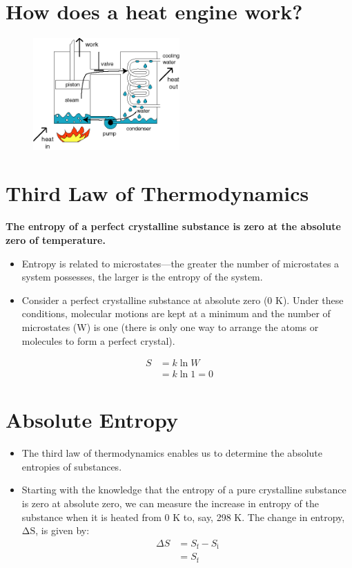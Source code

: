 \documentclass[a4paper,12pt,twocolumn]{article}
\begin{document}
\section{How does a heat engine work?}
\begin{figure}[h]
\centering
\includegraphics[width=0.5\textwidth]{heatengine.png}
\end{figure}

\section{Third Law of Thermodynamics} 
\begin{Box1}{}
\textbf{The entropy of a perfect crystalline substance is zero at the absolute zero of temperature.}
\end{Box1}

\begin{itemize}
\item Entropy is related to microstates—the greater the number of microstates a system possesses, the larger is the entropy of the system. 
\item Consider a perfect crystalline substance at absolute zero (0 K). Under these conditions, molecular motions are kept at a minimum and the number of microstates (W) is one (there is only one way to arrange the atoms or molecules to form a perfect crystal).
\end{itemize}
$$\begin{aligned}
S & =k \ln W \\
& =k \ln 1=0
\end{aligned}$$




\section{Absolute Entropy}
\begin{itemize}
\item The third law of thermodynamics enables us to determine the absolute entropies of substances.
 \item Starting with the knowledge that the entropy of a pure crystalline substance is zero at absolute zero, we can measure the increase in entropy of the substance when it is heated from 0 K to, say, 298 K. The change in entropy, $\mathrm{\Delta S}$, is given by:
 $$\begin{aligned}
\Delta S & =S_{\mathrm{f}}-S_{\mathrm{i}} \\
& =S_{\mathrm{f}}
\end{aligned}$$
\end{itemize}
\end{document}
